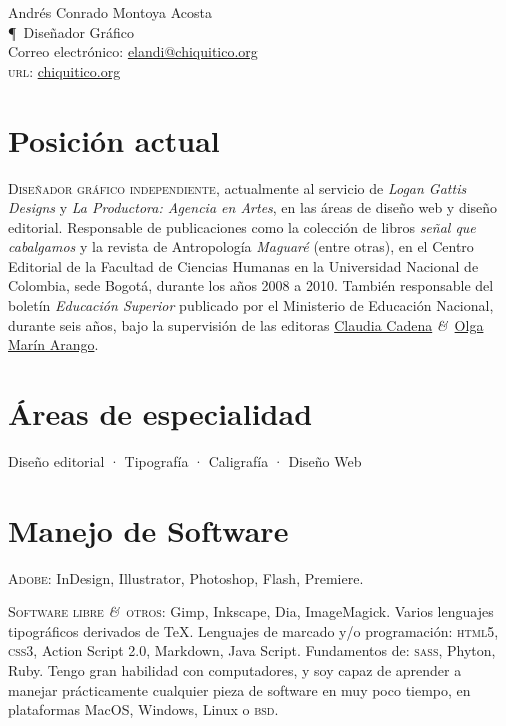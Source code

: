 \documentclass[12pt,letterpaper,final,usenames,dvipsnames]{article}
\newcommand{\signo}{\LARGE\P}
\newcommand{\amper}{\textit{\&}}
\begin{document}
{\LARGE Andrés Conrado Montoya Acosta}\\
{\signo\large\ Diseñador Gráfico}\\[24pt]
Correo electrónico: \href{mailto:elandi@chiquitico.org}{elandi@chiquitico.org}\\
\textsc{url}: \href{http://chiquitico.org}{chiquitico.org} 
\vfill

\section*{Posición actual}
\textsc{Diseñador gráfico independiente}, actualmente al servicio de \emph{Logan Ga\-ttis Designs} y \emph{La Productora: Agencia en Artes}, en las áreas de diseño web y diseño editorial. Responsable de publicaciones como la colección de libros \emph{señal que cabalgamos} y la revista de Antropología \emph{Maguaré} (entre otras), en el Centro Editorial de la Facultad de Ciencias Humanas en la Universidad Nacional de Colombia, sede Bogotá, durante los años 2008 a 2010. También responsable del boletín \emph{Educación Superior} publicado por el Ministerio de Educación Nacional, durante seis años, bajo la supervisión de las editoras \href{mailto:cadenasilva@fibertel.com.ar}{Claudia Cadena} \amper\ \href{mailto:olgamarinarango@gmail.com}{Olga Marín Arango}.

\section*{Áreas de especialidad}
Diseño editorial · Tipografía · Caligrafía · Diseño Web

\section*{Manejo de Software}
\textsc{Adobe:} InDesign, Illustrator, Photoshop, Flash, Premiere. 

\textsc{Software libre \amper\ otros:} Gimp, Inkscape, Dia, ImageMagick. Varios lenguajes tipográficos derivados de \TeX. Lenguajes de marcado y/o programación: \textsc{html5}, \textsc{css3}, Action Script 2.0, Markdown, Java Script. Fundamentos de: \textsc{sass}, Phyton, Ruby.  Tengo gran habilidad con computadores, y soy capaz de aprender a manejar prácticamente cualquier pieza de software en muy poco tiempo, en plataformas MacOS, Windows, Linux o \textsc{bsd}. 
\end{document}
